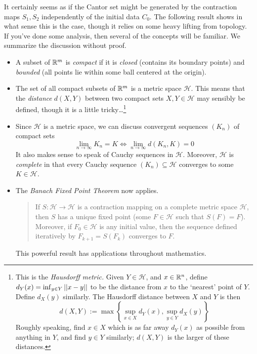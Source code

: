 \goodbreak



It certainly seems as if the Cantor set might be generated by the contraction maps $S_1,S_2$ independently of the initial data $C_0$. The following result shows in what sense this is the case, though it relies on some heavy lifting from topology. If you've done some analysis, then several of the concepts will be familiar. We summarize the discussion without proof.

\begin{itemize}
  \item A subset of $\mathbb{R}^m$ is \emph{compact} if it is \emph{closed} (contains its boundary points) and \emph{bounded} (all points lie within some ball centered at the origin).
  
  \item The set of all compact subsets of $\mathbb{R}^m$ is a metric space $\mathcal H$. This means that the \emph{distance} $d(X,Y)$ between two compact sets $X,Y\in\mathcal H$ may sensibly be defined, though it is a little tricky\ldots\footnote{This is the \emph{Hausdorff metric.} Given $Y\in\mathcal H$, and $x\in \mathbb{R}^n$, define $d_Y(x)=\inf_{y\in Y}\left| \left| x-y\right|\right|$ to be the distance from $x$ to the `nearest' point of $Y$. Define $d_X(y)$ similarly. The Hausdorff distance between $X$ and $Y$ is then
  \[d(X,Y):=\max\left\{\sup_{x\in X}d_Y(x),\sup_{y\in Y}d_X(y)\right\}\]
  Roughly speaking, find $x\in X$ which is as far away $d_Y(x)$ as possible from anything in $Y$, and find $y\in Y$ similarly; $d(X,Y)$ is the larger of these distances.}
  
  \item Since $\mathcal H$ is a metric space, we can discuss convergent sequences $(K_n)$ of compact sets
	\[\lim_{n\to\infty}K_n=K\iff \lim_{n\to\infty}d(K_n,K)=0\]
	It also makes sense to speak of Cauchy sequences in $\mathcal H$. Moreover, $\mathcal H$ is \emph{complete} in that every Cauchy sequence $(K_n)\subseteq\mathcal H$ converges to some $K\in\mathcal H$.
	
  \item The \emph{Banach Fixed Point Theorem} now applies.
  \begin{quote}
  {If $S:\mathcal H\to\mathcal H$ is a contraction mapping on a complete metric space $\mathcal H$, then $S$ has a unique fixed point (some $F\in\mathcal H$ such that $S(F)=F$). Moreover, if $F_0\in\mathcal H$ is any initial value, then the sequence defined iteratively by $F_{k+1}=S(F_k)$ converges to $F$.}
  \end{quote}
  This powerful result has applications throughout mathematics.
\end{itemize}


